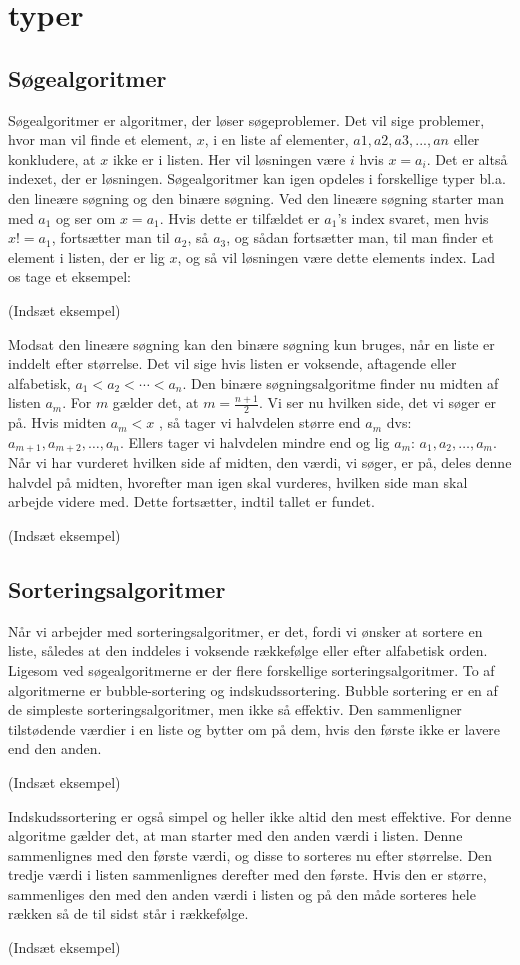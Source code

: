 \section{typer}
\subsection{Søgealgoritmer}
Søgealgoritmer er algoritmer, der løser søgeproblemer. Det vil sige problemer, hvor man vil finde et element, $x$, i en liste af elementer, $a1, a2, a3, ..., an$ eller konkludere, at $x$ ikke er i listen. Her vil løsningen være $i$ hvis $x=a_{i}$. Det er altså indexet, der er løsningen. Søgealgoritmer kan igen opdeles i forskellige typer bl.a. den lineære søgning og den binære søgning. Ved den lineære søgning starter man med $a_1$ og ser om $x=a_{1}$. Hvis dette er tilfældet er $a_{1}$'s index svaret, men hvis $x!=a_{1}$, fortsætter man til $a_{2}$, så $a_{3}$, og sådan fortsætter man, til man finder et element i listen, der er lig $x$, og så vil løsningen være dette elements index. Lad os tage et eksempel:
 
(Indsæt eksempel) 

Modsat den lineære søgning kan den binære søgning kun bruges, når en liste er inddelt efter størrelse. Det vil sige hvis listen er voksende, aftagende eller alfabetisk, $a_{1}<a_{2}<\dotsb<a_{n}$. Den binære søgningsalgoritme finder nu midten af listen $a_{m}$. For $m$ gælder det, at $m=\frac{n+1}{2}$. Vi ser nu hvilken side, det vi søger er på. Hvis midten $a_{m}<x$ , så tager vi halvdelen større end $a_{m}$ dvs: $a_{m+1}, a_{m+2},\dotsc,a_{n}$. Ellers tager vi halvdelen mindre end og lig $a_{m}$: $a_{1}, a_{2},\dotsc,a_{m}$. Når vi har vurderet hvilken side af midten, den værdi, vi søger, er på, deles denne halvdel på midten, hvorefter man igen skal vurderes, hvilken side man skal arbejde videre med. Dette fortsætter, indtil tallet er fundet. 

(Indsæt eksempel) 

\subsection{Sorteringsalgoritmer}
Når vi arbejder med sorteringsalgoritmer, er det, fordi vi ønsker at sortere en liste, således at den inddeles i voksende rækkefølge eller efter alfabetisk orden. Ligesom ved søgealgoritmerne er der flere forskellige sorteringsalgoritmer. To af algoritmerne er bubble-sortering og indskudssortering. Bubble sortering er en af de simpleste sorteringsalgoritmer, men ikke så effektiv. Den sammenligner tilstødende værdier i en liste og bytter om på dem, hvis den første ikke er lavere end den anden.

(Indsæt eksempel) 

Indskudssortering er også simpel og heller ikke altid den mest effektive. For denne algoritme gælder det, at man starter med den anden værdi i listen. Denne sammenlignes med den første værdi, og disse to sorteres nu efter størrelse. Den tredje værdi i listen sammenlignes derefter med den første. Hvis den er større, sammenliges den med den anden værdi i listen og på den måde sorteres hele rækken så de til sidst står i rækkefølge.

(Indsæt eksempel)
